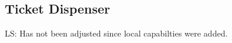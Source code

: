 \documentclass{article}
\newcommand\lau[1]{{\color{purple} \sf \footnotesize {LS: #1}}\\}
\newcommand{\var}[1]{\mathit{#1}}
\newcommand{\hs}{\var{hs}}
\newcommand{\codelabel}[1]{\mathit{#1}}
\newcommand{\malloc}{\codelabel{malloc}}
\begin{document}
\subsection{Ticket Dispenser}
\label{sec:tick-disp}
\newcommand{\hsfoot}{\hs_\var{footprint}}
\newcommand{\hsframe}{\hs_\var{frame}}
\newcommand{\size}{\var{size}}
\newcommand{\rio}{r_{io}}
\newcommand{\adv}{\codelabel{adv}}
\newcommand{\advb}{\var{adv_{base}}}
\newcommand{\adve}{\var{adv_{end}}}
\newcommand{\initb}{\var{init}_{base}}
\newcommand{\inite}{\var{init}_{end}}
\newcommand{\mrlen}{5cm}
\newcommand{\retm}{\var{ret}_{\malloc}}
\newcommand{\reta}{\var{ret}_{\adv}}
\newcommand{\base}{\var{base}}
\newcommand{\eend}{\var{end}}
\newcommand{\bracket}[1]{\multirow{#1}{*}{\ensuremath{
 \left . \vphantom{\begin{array}{l}
 \ifthenelse{\equal{#1}{1}}{3\\}{
    \ifthenelse{\equal{#1}{2}}{3\\3\\}{
    \ifthenelse{\equal{#1}{3}}{3\\3\\3\\}{
    \ifthenelse{\equal{#1}{4}}{3\\3\\3\\3\\}{
    \ifthenelse{\equal{#1}{5}}{3\\3\\3\\3\\3\\}{
    \ifthenelse{\equal{#1}{6}}{3\\3\\3\\3\\3\\3\\}{
      3\\3\\3\\3\\3\\3\\3\\ %
  }}}}}}
  \end{array}} \right \}}}
}
\newcommand{\annotate}[2]{\multirow{#1}{\mrlen}{\scriptsize #2}}
\lau{Has not been adjusted since local capabilties were added.}
\end{document}
